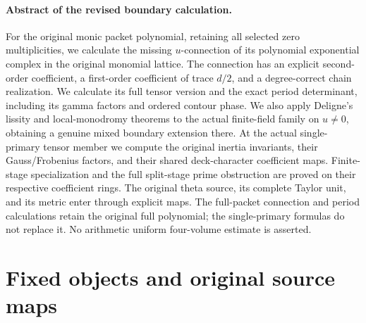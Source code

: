 \providecommand{\Tr}{\operatorname{Tr}}
\providecommand{\coker}{\operatorname{coker}}
\providecommand{\Spec}{\operatorname{Spec}}
\providecommand{\rem}{\operatorname{rem}}
\providecommand{\diag}{\operatorname{diag}}
\providecommand{\C}{\mathbb C}
\providecommand{\F}{\mathbb F}
\providecommand{\A}{\mathbb A}
\providecommand{\Gm}{{\mathbb G_m}}
\providecommand{\HH}{\mathcal H}
\providecommand{\BB}{\mathscr B}



\paragraph{Abstract of the revised boundary calculation.}
For the original monic packet polynomial, retaining all selected zero
multiplicities, we calculate the missing $u$-connection of its polynomial
exponential complex in the original monomial lattice.  The connection has
an explicit second-order coefficient, a first-order coefficient of trace
$d/2$, and a degree-correct chain realization.  We calculate its full
tensor version and the exact period determinant, including its gamma
factors and ordered contour phase.  We also apply Deligne's lissity and
local-monodromy theorems to the actual finite-field family on $u\ne0$,
obtaining a genuine mixed boundary extension there.  At the actual
single-primary tensor member we compute the original inertia invariants,
their Gauss/Frobenius factors, and their shared deck-character coefficient
maps.  Finite-stage specialization and the full split-stage prime
obstruction are proved on their respective coefficient rings.  The
original theta source, its complete Taylor unit, and its metric enter
through explicit maps.  The full-packet connection and period calculations
retain the original full polynomial; the single-primary formulas do not
replace it.  No arithmetic uniform four-volume estimate is asserted.


\section{Fixed objects and original source maps}

